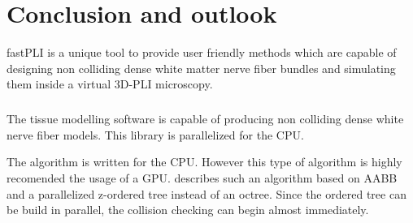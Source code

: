 \setcounter{chapter}{8}
\chapter{Conclusion and outlook}
\label{sec:summary}
% 
\ac{fastPLI} is a unique tool to provide user friendly methods which are capable of designing non colliding dense white matter nerve fiber bundles and simulating them inside a virtual \ac{3D-PLI} microscopy.
% 
\paragraph{}
The tissue modelling software is capable of producing non colliding dense white nerve fiber models.
This library is parallelized for the \ac{CPU}.
\par
The algorithm is written for the \ac{CPU}. However this type of algorithm is highly recomended the usage of a \ac{GPU}.
\cite{Karras2012} describes such an algorithm based on \ac{AABB} and a parallelized z-ordered tree instead of an octree.
Since the \-ordered tree can be build in parallel, the collision checking can begin almost immediately.
% 
\paragraph{}
\dummy{}
\par
\dummy[kobuschk]{}
% 
% 
\paragraph{}
% 
\paragraph{}
% 
\paragraph{}
% 